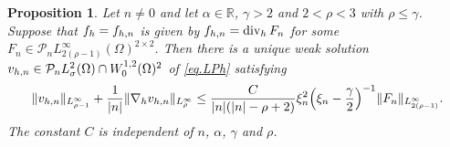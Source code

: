 \documentclass[11pt,a4paper]{article}
\numberwithin{equation}{section}
\newtheorem{proposition}[theorem]{Proposition}
{\theorembodyfont{\rmfamily}\newtheorem{remark}[theorem]{Remark}}
{\theorembodyfont{\rmfamily}\newtheorem{remarks}[theorem]{Remarks}}
\newcommand{\R}{\mathbb{R}}
\newcommand{\opdiv}{\operatorname{div}}
\newcommand{\h}{{\rm h}}
\begin{document}
%
\begin{proposition}\label{prop.LPh.nonzero}
Let $n\neq0$ and let $\alpha\in\R$, $\gamma>2$ and $2<\rho<3$ with $\rho\le\gamma$. Suppose that $f_\h=f_{\h,n}$ is given by $f_{\h,n}=\opdiv_\h F_n$ for some $F_n\in {\mathcal P}_n L^\infty_{2(\rho-1)}(\Omega)^{2\times2}$. Then there is a unique weak solution $v_{\h,n}\in {\mathcal P}_n L^2_\sigma(\Omega) \cap W^{1,2}_0(\Omega)^2$ of \eqref{eq.LPh} satisfying 
%
\begin{align}\label{est1.prop.LPh.nonzero}
\|v_{\h,n}\|_{L^\infty_{\rho-1}} 
+ \frac{1}{|n|} \|\nabla_\h v_{\h,n}\|_{L^\infty_{\rho}} 
\le 
\frac{C}{|n|(|n|-\rho+2)} 
\xi_n^2 
\Big(\xi_n - \frac{\gamma}2\Big)^{-1} 
\|F_n\|_{L^\infty_{2(\rho-1)}}. 
\end{align}
%
The constant $C$ is independent of $n$, $\alpha$, $\gamma$ and $\rho$.
\end{proposition}
%
%
\end{document}
